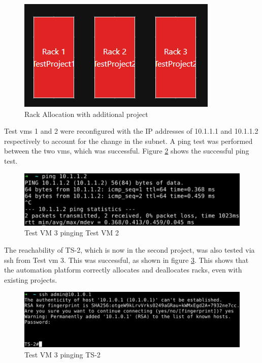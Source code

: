 \begin{figure}[H]
    \centering
    \includegraphics[scale=1.2]{images/two-projects-racks.png}
    \caption{Rack Allocation with additional project}
    \label{fig:two-projects-racks}
\end{figure}

Test \gls{vm}s 1 and 2 were reconfigured with the IP addresses of 10.1.1.1 and 10.1.1.2 respectively to account for the change in the subnet. A ping test was performed between the two \gls{vm}s, which was successful. Figure \ref{fig:two-projects-ping} shows the successful ping test.

\begin{figure}[H]
    \centering
    \includegraphics[scale=0.8]{images/two-projects-ping.png}
    \caption{Test VM 3 pinging Test VM 2}
    \label{fig:two-projects-ping}
\end{figure}

The reachability of TS-2, which is now in the second project, was also tested via \gls{ssh} from Test \gls{vm} 3. This was successful, as shown in figure \ref{fig:two-projects-ssh}. This shows that the automation platform correctly allocates and deallocates racks, even with existing projects.

\begin{figure}[H]
    \centering
    \includegraphics[scale=0.7]{images/two-projects-ssh.png}
    \caption{Test VM 3 pinging TS-2}
    \label{fig:two-projects-ssh}
\end{figure}

